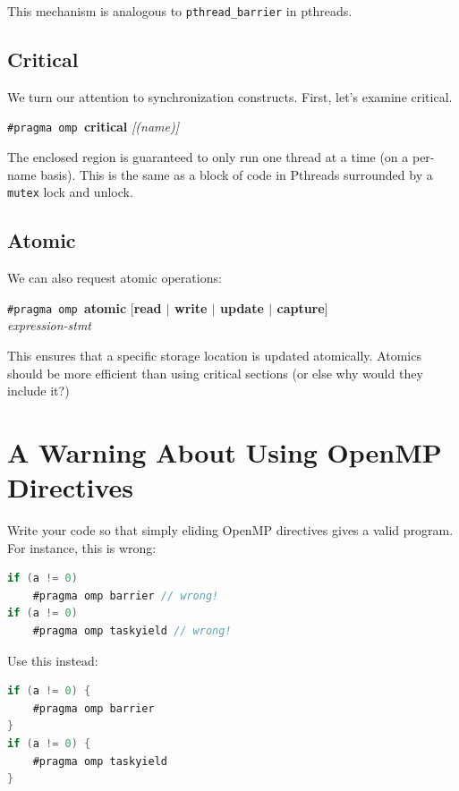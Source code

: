 \documentclass[a4paper]{report}
\begin{document}
     This mechanism is analogous to {\tt pthread\_barrier} in pthreads.

  \subsection*{Critical} We turn our attention to synchronization constructs.
First, let's examine critical.
  \begin{center}
    {\tt \#pragma omp }{\bf critical} {\it [(name)]}
  \end{center}

    The enclosed region is guaranteed to only run one thread at a time
      (on a per-name basis).
    This is the same as a block of code in Pthreads surrounded by a {\tt mutex} lock
      and unlock.

\subsection*{Atomic}
We can also request atomic operations:

    {\tt \#pragma omp }{\bf atomic} [{\bf read $\mid$ write $\mid$ update $\mid$ capture}]\\
    {\it expression-stmt}
    
This ensures that a specific storage location is updated
    atomically.  Atomics should be more efficient than using critical
    sections (or else why would they include it?)

\section*{A Warning About Using OpenMP Directives}
  Write your code so that simply eliding OpenMP directives gives a valid program. For instance, this is wrong:
  \begin{lstlisting}[language=C,morekeywords={foreach,pragma,omp,parallel,single,nowait,task,untied,barrier,taskyield}]
if (a != 0)
    #pragma omp barrier // wrong!
if (a != 0)
    #pragma omp taskyield // wrong!
  \end{lstlisting}

  Use this instead:
  \begin{lstlisting}[language=C,morekeywords={foreach,pragma,omp,parallel,single,nowait,task,untied,barrier,taskyield}]
if (a != 0) {
    #pragma omp barrier
}
if (a != 0) {
    #pragma omp taskyield
}
  \end{lstlisting}
\end{document}
